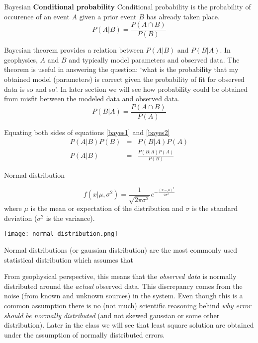 \documentclass[11pt,titlepage,fleqn]{article}
\begin{document}
\begin{section}{Bayesian}
{\bf Conditional probability}
Conditional probability is the probability of occurence of an event $A$ given a prior event $B$ has already taken place.
\begin{equation}
P(A|B) = \frac{P(A \cap B)}{P(B)} \label{bayes1}
\end{equation}

Bayesian theorem provides a relation between $P(A|B)$ and $P(B|A)$. In geophysics, $A$ and $B$ and typically model parameters and observed data. The theorem is useful in answering the question: `what is the probability that my obtained model (parameters) is correct given the probability of fit for observed data is so and so'.
In later section we will see how probability could be obtained from misfit between the modeled data and observed data.
\begin{equation}
P(B|A) = \frac{P(A \cap B)}{P(A)} \label{bayes2}
\end{equation}

Equating both sides of equations \ref{bayes1} and \ref{bayes2}
\begin{eqnarray}
P(A|B) P(B) &=& P(B|A) P(A) \\
P(A|B) &=& \frac{ P(B|A) P(A) }{P(B)}
\end{eqnarray}

\end{section}

\begin{section}{Normal distribution}

\begin{equation}
f(x|\mu,\sigma^2) = \frac{1}{\sqrt{2 \pi \sigma^2}} e ^{-\frac{(x - \mu)^2}{2 \sigma^2}}
\end{equation}
where $\mu$ is the mean or expectation of the distribution and $\sigma$ is the standard deviation ($\sigma^2$ is the variance).

\texttt{[image: normal\_distribution.png]}

Normal distributions (or gaussian distribution) are the most commonly used statistical distribution which assumes that

From geophysical perspective, this means that the {\it observed data} is normally distributed around the {\it actual} observed data. This discrepancy comes from the noise (from known and unknown sources) in the system. Even though this is a common assumption there is no (not much) scientific reasoning behind {\it why error should be normally distributed} (and not skewed gaussian or some other distribution). Later in the class we will see that least square solution are obtained under the assumption of normally distributed errors.
\end{section}
\end{document}
